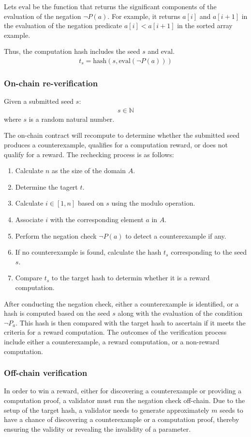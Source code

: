 \documentclass[runningheads]{llncs}
\begin{document}
Lets \(\text{eval}\) be the function that returns the significant components of the evaluation of the negation \(\neg P(a)\).  For example, it returns \(a[i]\) and \(a[i + 1]\) in the evaluation of the negation predicate \(a[i] < a[i+1]\) in the sorted array example.

Thus, the computation hash includes the seed  \( s \) and \(\text{eval}\). 
\begin{align}
t_s = \text{hash}(s, \text{eval}(\neg P(a)))
\end{align}
\subsubsection{On-chain re-verification}
Given a submitted seed $s$: 
\begin{align}
s \in \mathbb{N} 
\end{align}
where $s$ is a random natural number.

The on-chain contract will recompute to determine whether the submitted seed produces a counterexample, qualifies for a computation reward, or does not qualify for a reward. The rechecking process is as follows:
\begin{enumerate}
\item Calculate $n$ as the size of the domain $A$.
\item Determine the tagert $t$.
\item Calculate $i \in [1, n]$ based on $s$ using the modulo operation.
\item Associate \( i \) with the corresponding element $a$ in $A$.
\item Perform the negation check $\neg P(a)$ to detect a counterexample if any.
\item If no counterexample is found, calculate the hash \( t_s \) corresponding to the seed \( s \).
\item Compare \( t_s \) to the target hash to determin whether it is a reward computation.
\end{enumerate}

After conducting the negation check, either a counterexample is identified, or a hash is computed based on the seed $s$ along with the evaluation of the condition $\neg P_{a}$. This hash is then compared with the target hash to ascertain if it meets the criteria for a reward computation. The outcomes of the verification process include either a counterexample, a reward computation, or a non-reward computation.
\subsubsection{Off-chain verification}
In order to win a reward, either for discovering a counterexample or providing a computation proof, a validator must run the negation check off-chain. Due to the setup of the target hash, a validator needs to generate approximately $m$ seeds to have a chance of discovering a counterexample or a computation proof, thereby ensuring the validity or revealing the invalidity of a parameter.
\end{document}

